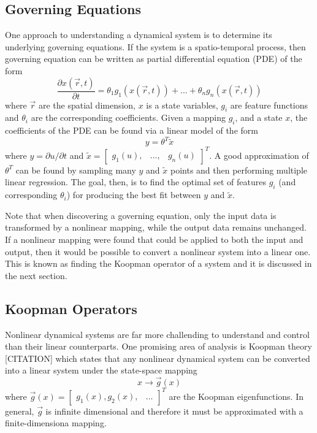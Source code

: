 \documentclass{article}
\begin{document}
\subsection{Governing Equations}
One approach to understanding a dynamical system is to determine its underlying governing equations. If the system is a spatio-temporal process, then governing equation can be written as partial differential equation (PDE) of the form
\begin{equation}
    \frac{\partial x (\vec{r},t)}{\partial t} = \theta_1 g_1(x(\vec{r},t)) + ... + \theta_n g_n(x(\vec{r},t))
\end{equation}
where $\vec{r}$ are the spatial dimension, $x$ is a state variables, $g_i$ are feature functions and $\theta_i$ are the corresponding coefficients. Given a mapping $g_i$, and a state $x$, the coefficients of the PDE can be found via a linear model of the form 
\begin{equation}
 y = \theta^T \tilde{x}
 \end{equation}
where $y = \partial u/ \partial t$ and $\tilde{x} = \begin{bmatrix}g_1(u), & \hdots, & g_n(u) \end{bmatrix}^T$. A good approximation of $\theta^T$ can be found by sampling many $y$ and $\tilde{x}$ points and then performing multiple linear regression. The goal, then, is to find the optimal set of features $g_i$ (and corresponding $\theta_i$) for producing the best fit between $y$ and $\tilde{x}$.

Note that when discovering a governing equation, only the input data is transformed by a nonlinear mapping, while the output data remains unchanged. If a nonlinear mapping were found that could be applied to both the input and output, then it would be possible to convert a nonlinear system into a linear one. This is known as finding the Koopman operator of a system and it is discussed in the next section.

\subsection{Koopman Operators}
Nonlinear dynamical systems are far more challending to understand and control than their linear counterparts. One promising area of analysis is Koopman theory [CITATION] which states that any nonlinear dynamical system can be converted into a linear system under the state-space mapping
\begin{equation}
x \rightarrow \vec{g}(x)
\end{equation}
where $\vec{g}(x) = \begin{bmatrix} g_1(x), g_2(x), & \hdots \end{bmatrix}^T$ are the Koopman eigenfunctions. In general, $\vec{g}$ is infinite dimensional and therefore it must be approximated with a finite-dimensiona mapping.
\end{document}
